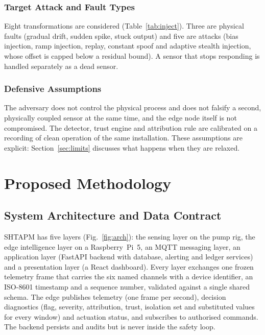 \documentclass[11pt,a4paper]{article}
\begin{document}
\subsubsection{Target Attack and Fault Types}

Eight transformations are considered (Table~\ref{tab:inject}). Three are physical faults (gradual drift, sudden spike, stuck output) and five are attacks (bias injection, ramp injection, replay, constant spoof and adaptive stealth injection, whose offset is capped below a residual bound). A sensor that stops responding is handled separately as a dead sensor.

\subsubsection{Defensive Assumptions}

The adversary does not control the physical process and does not falsify a second, physically coupled sensor at the same time, and the edge node itself is not compromised. The detector, trust engine and attribution rule are calibrated on a recording of clean operation of the same installation. These assumptions are explicit: Section~\ref{sec:limits} discusses what happens when they are relaxed.

\section{Proposed Methodology}
\label{sec:method}

\subsection{System Architecture and Data Contract}

SHTAPM has five layers (Fig.~\ref{fig:arch}): the sensing layer on the pump rig, the edge intelligence layer on a Raspberry~Pi~5, an MQTT messaging layer, an application layer (FastAPI backend with database, alerting and ledger services) and a presentation layer (a React dashboard). Every layer exchanges one frozen telemetry frame that carries the six named channels with a device identifier, an ISO-8601 timestamp and a sequence number, validated against a single shared schema. The edge publishes telemetry (one frame per second), decision diagnostics (flag, severity, attribution, trust, isolation set and substituted values for every window) and actuation status, and subscribes to authorised commands. The backend persists and audits but is never inside the safety loop.
\end{document}
